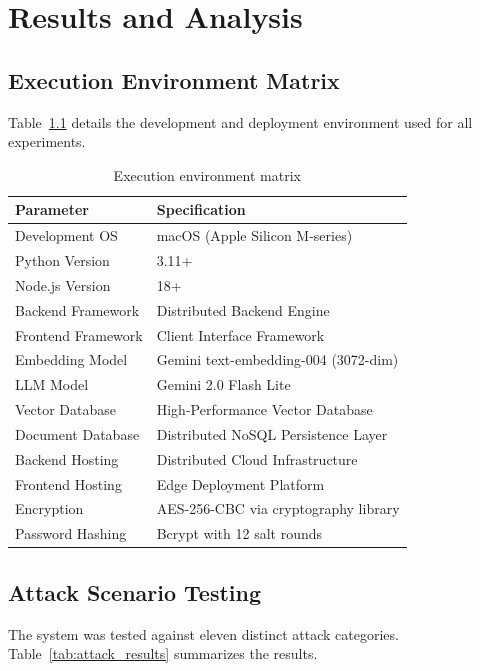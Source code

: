 \chapter{Results and Analysis}

\section{Execution Environment Matrix}

Table~\ref{tab:env} details the development and deployment environment used for all experiments.

\begin{table}[H]
\centering
\caption{Execution environment matrix}
\label{tab:env}
\begin{tabular}{ll}
\toprule
\textbf{Parameter} & \textbf{Specification} \\
\midrule
Development OS & macOS (Apple Silicon M-series) \\
Python Version & 3.11+ \\
Node.js Version & 18+ \\
Backend Framework & Distributed Backend Engine \\
Frontend Framework & Client Interface Framework \\
Embedding Model & Gemini text-embedding-004 (3072-dim) \\
LLM Model & Gemini 2.0 Flash Lite \\
Vector Database & High-Performance Vector Database \\
Document Database & Distributed NoSQL Persistence Layer \\
Backend Hosting & Distributed Cloud Infrastructure \\
Frontend Hosting & Edge Deployment Platform \\
Encryption & AES-256-CBC via cryptography library \\
Password Hashing & Bcrypt with 12 salt rounds \\
\bottomrule
\end{tabular}
\end{table}

\section{Attack Scenario Testing}

The system was tested against eleven distinct attack categories. Table~\ref{tab:attack_results} summarizes the results.

